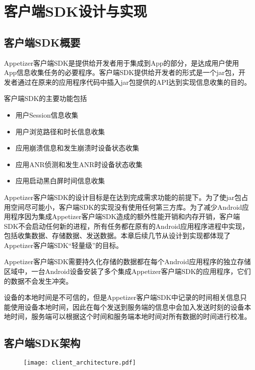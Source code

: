 
\chapter{客户端SDK设计与实现}
\label{chap:client}

\section{客户端SDK概要}
\label{sec:clientSDKOverview}

Appetizer客户端SDK是提供给开发者用于集成到App的部分，是达成用户使用App信息收集任务的必要程序。客户端SDK提供给开发者的形式是一个jar包，开发者通过在原来的应用程序代码中插入jar包提供的API达到实现信息收集的目的。

客户端SDK的主要功能包括

 \begin{itemize}
 	\item 用户Session信息收集
 	\item 用户浏览路径和时长信息收集
 	\item 应用崩溃信息和发生崩溃时设备状态收集
 	\item 应用ANR侦测和发生ANR时设备状态收集
 	\item 应用启动黑白屏时间信息收集
 \end{itemize}
 
Appetizer客户端SDK的设计目标是在达到完成需求功能的前提下。为了使jar包占用空间尽可能小，客户端SDK的实现没有使用任何第三方库。为了减少Android应用程序因为集成Appetizer客户端SDK造成的额外性能开销和内存开销，客户端SDK不会启动任何新的进程，所有任务都在原有的Android应用程序进程中实现，包括收集数据、存储数据、发送数据。本章后续几节从设计到实现都体现了Appetizer客户端SDK“轻量级”的目标。
 
Appetizer客户端SDK需要持久化存储的数据都在每个Android应用程序的独立存储区域中，一台Android设备安装了多个集成Appetizer客户端SDK的应用程序，它们的数据不会发生冲突。

设备的本地时间是不可信的，但是Appetizer客户端SDK中记录的时间相关信息只能使用设备本地时间，因此在每个发送到服务端的信息中会加入发送时刻的设备本地时间，服务端可以根据这个时间和服务端本地时间对所有数据的时间进行校准。

\section{客户端SDK架构}
\label{sec:clientSDKArch}

\begin{figure}[!htp]
	\centering
	\texttt{[image: client\_architecture.pdf]}
\end{figure}

